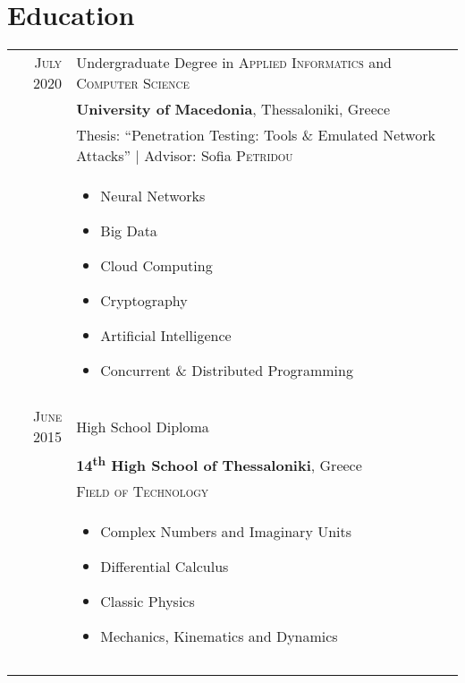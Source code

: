 \documentclass[a4paper,10pt]{article}
\begin{document}
\section{Education}
\begin{tabular}{rp{11cm}}	
\textsc{July} 2020& Undergraduate Degree in \textsc{Applied Informatics} and \textsc{Computer Science} \\& \normalsize\textbf{University of Macedonia}, Thessaloniki, Greece\\
& Thesis: ``Penetration Testing: Tools \& Emulated Network Attacks'' | \small Advisor: Sofia \textsc{Petridou}\\
&\normalsize
\begin{itemize}
    \item Neural Networks
    \item Big Data
    \item Cloud Computing
    \item Cryptography
    \item Artificial Intelligence
    \item Concurrent \& Distributed Programming
\end{itemize} \\ \\
\textsc{June} 2015 & High School Diploma \\& \textbf{14\textsuperscript{th} High School of Thessaloniki}, Greece\\
&\textsc{Field of Technology}\\&
\begin{itemize}
    \item Complex Numbers and Imaginary Units
    \item Differential Calculus
    \item Classic Physics
    \item Mechanics, Kinematics and Dynamics

\end{itemize}
\\ \\ \\
\end{tabular}

\end{document}
